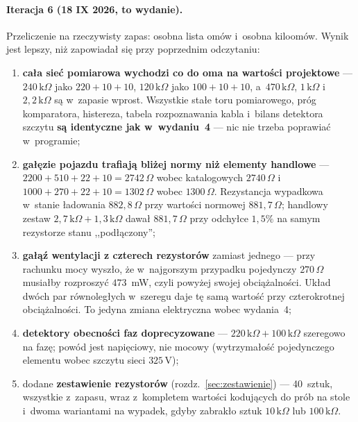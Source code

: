 \documentclass[a4paper,11pt]{article}
\newcommand{\ohm}{\,\Omega}
\newcommand{\kohm}{\,\mathrm{k}\Omega}
\newcommand{\volt}{\,\mathrm{V}}
\begin{document}
\paragraph{Iteracja 6 (18 IX 2026, to wydanie).} Przeliczenie na rzeczywisty zapas:
osobna lista omów i~osobna kiloomów. Wynik jest lepszy, niż zapowiadał się przy
poprzednim odczytaniu:

\begin{enumerate}
\item \textbf{cała sieć pomiarowa wychodzi co do oma na wartości projektowe} ---
      $240\kohm$ jako $220+10+10$, $120\kohm$ jako $100+10+10$, a~$470\kohm$,
      $1\kohm$ i~$2{,}2\kohm$ są w~zapasie wprost. Wszystkie stałe toru pomiarowego,
      próg komparatora, histereza, tabela rozpoznawania kabla i~bilans detektora
      szczytu \textbf{są identyczne jak w~wydaniu~4} --- nic nie trzeba poprawiać
      w~programie;
\item \textbf{gałęzie pojazdu trafiają bliżej normy niż elementy handlowe} ---
      $2200+510+22+10=2742\ohm$ wobec katalogowych $2740\ohm$ i~$1000+270+22+10
      =1302\ohm$ wobec $1300\ohm$. Rezystancja wypadkowa w~stanie ładowania
      $882{,}8\ohm$ przy wartości normowej $881{,}7\ohm$; handlowy zestaw
      $2{,}7\kohm + 1{,}3\kohm$ dawał $881{,}7\ohm$ przy odchyłce $1{,}5\%$
      na samym rezystorze stanu ,,podłączony'';
\item \textbf{gałąź wentylacji z czterech rezystorów} zamiast jednego --- przy
      rachunku mocy wyszło, że w~najgorszym przypadku pojedynczy $270\ohm$ musiałby
      rozproszyć $473$~mW, czyli powyżej swojej obciążalności. Układ dwóch par
      równoległych w~szeregu daje tę samą wartość przy czterokrotnej obciążalności.
      To jedyna zmiana elektryczna wobec wydania~4;
\item \textbf{detektory obecności faz doprecyzowane} --- $220\kohm+100\kohm$
      szeregowo na fazę; powód jest napięciowy, nie mocowy (wytrzymałość
      pojedynczego elementu wobec szczytu sieci $325\volt$);
\item dodane \textbf{zestawienie rezystorów} (rozdz.~\ref{sec:zestawienie}) ---
      40~sztuk, wszystkie z~zapasu, wraz z~kompletem wartości kodujących do prób
      na stole i~dwoma wariantami na wypadek, gdyby zabrakło sztuk $10\kohm$
      lub $100\kohm$.
\end{enumerate}
\end{document}
